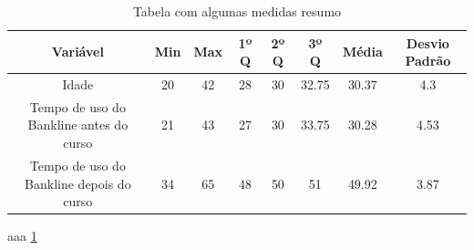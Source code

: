 \documentclass[]{article}
\begin{document}
\begin{table}[h!]
  \begin{center}
    \begin{tabular}{c|c|c|c|c|c|c|c}
    \hline
      \textbf{Variável} & \textbf{Min} & \textbf{Max} & \textbf{1º Q} & \textbf{2º Q} & \textbf{3º Q} & \textbf{Média}  & \textbf{Desvio Padrão} \\
      \hline
      Idade & 20 & 42 & 28 & 30 & 32.75 & 30.37 & 4.3\\
      Tempo de uso do Bankline antes do curso & 21 & 43 & 27 & 30 & 33.75 & 30.28 & 4.53\\
      Tempo de uso do Bankline depois do curso & 34 & 65 & 48 & 50 & 51 & 49.92 & 3.87 \\ 
      \hline
    \end{tabular}
    \caption{Tabela com algumas medidas resumo}
     \label{table:tab2}
  \end{center}
\end{table}

aaa \ref{table:tab2}
\end{document}
